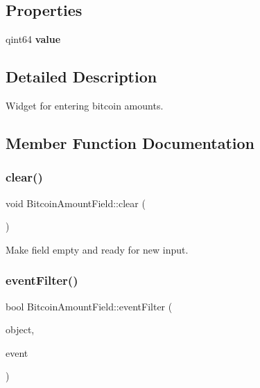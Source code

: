 \subsection*{Properties}
\begin{DoxyCompactItemize}
\item 
\mbox{\label{class_bitcoin_amount_field_ad9934f4b11cc805cb489801b28121e44}} 
qint64 {\bfseries value}
\end{DoxyCompactItemize}


\subsection{Detailed Description}
Widget for entering bitcoin amounts. 

\subsection{Member Function Documentation}
\mbox{\label{class_bitcoin_amount_field_a66fb8e84968302c0a1b1914338ff8001}} 
\subsubsection{\texorpdfstring{clear()}{clear()}}
{\footnotesize\ttfamily void Bitcoin\+Amount\+Field\+::clear (\begin{DoxyParamCaption}{ }\end{DoxyParamCaption})}

Make field empty and ready for new input. \mbox{\label{class_bitcoin_amount_field_acc04caa1dfdc0c007ec978fb05ac9061}} 
\subsubsection{\texorpdfstring{eventFilter()}{eventFilter()}}
{\footnotesize\ttfamily bool Bitcoin\+Amount\+Field\+::event\+Filter (\begin{DoxyParamCaption}\item[{Q\+Object $\ast$}]{object,  }\item[{Q\+Event $\ast$}]{event }\end{DoxyParamCaption})\hspace{0.3cm}{\ttfamily [protected]}}

